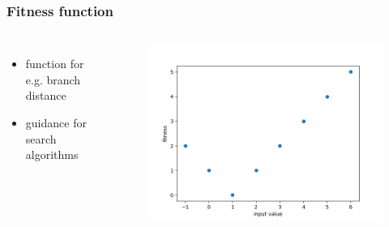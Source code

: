\begin{frame}
	\frametitle{Fitness function}
	
	\begin{columns}[c]
		

		\begin{itemize}
			\item function for e.g. branch distance
			\item guidance for search algorithms
		\end{itemize}
		
		\begin{figure}
			\includegraphics[width=1\textwidth]{figures/plot_guidance}
		\end{figure}
		
		

	\end{columns}
	
\end{frame}

